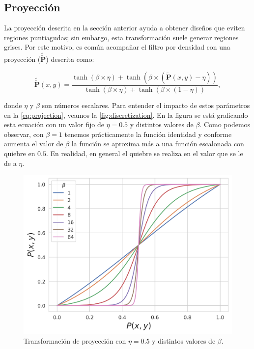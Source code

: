 \subsection{Proyección}

La proyección descrita en la sección anterior ayuda a obtener diseños que eviten regiones puntiagudas;
sin embargo, esta transformación suele generar regiones grises.
Por este motivo, es común acompañar el filtro por densidad con una proyección 
($\widetilde{\widetilde{\boldsymbol{P}}}$) descrita como:

\begin{equation}
  \widetilde{\widetilde{\boldsymbol{P}}}(x, y) = \frac{\tanh (\beta \times \eta) + \tanh (\beta \times
  (\widetilde{\boldsymbol{P}}(x, y)
  - \eta))}{\tanh (\beta \times \eta) + \tanh (\beta \times (1 - \eta))},
  \label{eq:projection}
\end{equation}

\noindent donde $\eta$ y $\beta$ son números escalares. Para entender el impacto de estos parámetros
en la \autoref{eq:projection}, veamos la \autoref{fig:discretization}.
En la figura se está graficando esta ecuación con un valor fijo de $\eta = 0.5$ y distintos valores de
$\beta$.
Como podemos observar, con $\beta = 1$ tenemos prácticamente la función identidad y conforme aumenta
el valor de $\beta$ la función se aproxima más a una función escalonada con quiebre en $0.5$. 
En realidad, en general el quiebre se realiza en el valor que se le de a $\eta$.

    \begin{figure}[ht]
      \centering
      \includegraphics[scale=0.75]{image/theory/discretization.png}
      \caption{Transformación de proyección con $\eta = 0.5$ y distintos valores
      de $\beta$.}
      \label{fig:discretization}
    \end{figure}

